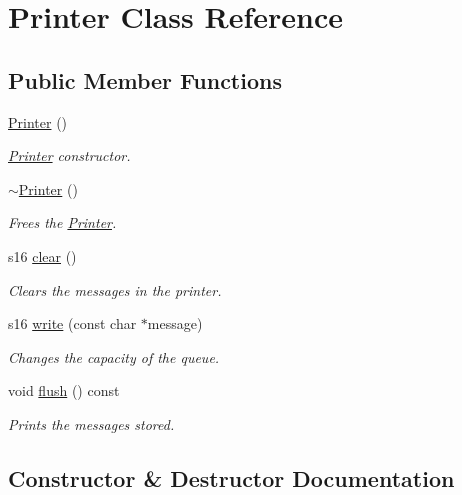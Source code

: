 \hypertarget{class_printer}{}\section{Printer Class Reference}
\label{class_printer}
\subsection*{Public Member Functions}
\begin{DoxyCompactItemize}
\item 
\hyperlink{class_printer_a1aba91ebff40aebda570d92f17f28b27}{Printer} ()
\begin{DoxyCompactList}\small\item\em \hyperlink{class_printer}{Printer} constructor. \end{DoxyCompactList}\item 
\hyperlink{class_printer_a011da1d2aa31df5440071c0b6e80eb1d}{$\sim$\+Printer} ()
\begin{DoxyCompactList}\small\item\em Frees the \hyperlink{class_printer}{Printer}. \end{DoxyCompactList}\item 
s16 \hyperlink{class_printer_a5ed3289b1d1494ad44c0b56a48ad3e15}{clear} ()
\begin{DoxyCompactList}\small\item\em Clears the messages in the printer. \end{DoxyCompactList}\item 
s16 \hyperlink{class_printer_a3c089dbcfb957de33f01bd3691bb75d6}{write} (const char $\ast$message)
\begin{DoxyCompactList}\small\item\em Changes the capacity of the queue. \end{DoxyCompactList}\item 
void \hyperlink{class_printer_ab16ea56023ef4f1d2d3a5a18651f0ae9}{flush} () const
\begin{DoxyCompactList}\small\item\em Prints the messages stored. \end{DoxyCompactList}\end{DoxyCompactItemize}


\subsection{Constructor \& Destructor Documentation}
\mbox{\label{class_printer_a1aba91ebff40aebda570d92f17f28b27}} 
